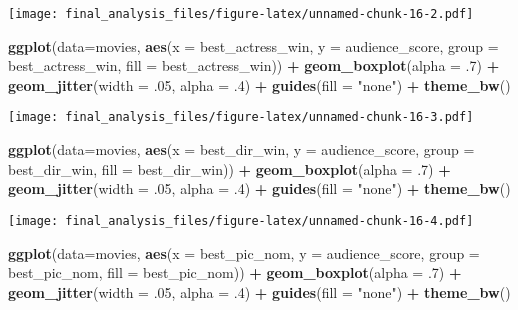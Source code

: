 \documentclass[]{article}
\newenvironment{Shaded}{\begin{snugshade}}{\end{snugshade}}
\newcommand{\DataTypeTok}[1]{\textcolor[rgb]{0.13,0.29,0.53}{#1}}
\newcommand{\FloatTok}[1]{\textcolor[rgb]{0.00,0.00,0.81}{#1}}
\newcommand{\KeywordTok}[1]{\textcolor[rgb]{0.13,0.29,0.53}{\textbf{#1}}}
\newcommand{\NormalTok}[1]{#1}
\newcommand{\OperatorTok}[1]{\textcolor[rgb]{0.81,0.36,0.00}{\textbf{#1}}}
\newcommand{\StringTok}[1]{\textcolor[rgb]{0.31,0.60,0.02}{#1}}
\begin{document}
\texttt{[image: final\_analysis\_files/figure-latex/unnamed-chunk-16-2.pdf]}

\begin{Shaded}
\begin{Highlighting}[]
\KeywordTok{ggplot}\NormalTok{(}\DataTypeTok{data=}\NormalTok{movies, }\KeywordTok{aes}\NormalTok{(}\DataTypeTok{x =}\NormalTok{ best_actress_win, }\DataTypeTok{y =}\NormalTok{ audience_score, }\DataTypeTok{group =}\NormalTok{ best_actress_win, }\DataTypeTok{fill =}\NormalTok{ best_actress_win)) }\OperatorTok{+}\StringTok{ }\KeywordTok{geom_boxplot}\NormalTok{(}\DataTypeTok{alpha =} \FloatTok{.7}\NormalTok{) }\OperatorTok{+}\StringTok{ }\KeywordTok{geom_jitter}\NormalTok{(}\DataTypeTok{width =} \FloatTok{.05}\NormalTok{, }\DataTypeTok{alpha =} \FloatTok{.4}\NormalTok{) }\OperatorTok{+}\StringTok{ }\KeywordTok{guides}\NormalTok{(}\DataTypeTok{fill =} \StringTok{"none"}\NormalTok{) }\OperatorTok{+}\StringTok{ }\KeywordTok{theme_bw}\NormalTok{()}
\end{Highlighting}
\end{Shaded}

\texttt{[image: final\_analysis\_files/figure-latex/unnamed-chunk-16-3.pdf]}

\begin{Shaded}
\begin{Highlighting}[]
\KeywordTok{ggplot}\NormalTok{(}\DataTypeTok{data=}\NormalTok{movies, }\KeywordTok{aes}\NormalTok{(}\DataTypeTok{x =}\NormalTok{ best_dir_win, }\DataTypeTok{y =}\NormalTok{ audience_score, }\DataTypeTok{group =}\NormalTok{ best_dir_win, }\DataTypeTok{fill =}\NormalTok{ best_dir_win)) }\OperatorTok{+}\StringTok{ }\KeywordTok{geom_boxplot}\NormalTok{(}\DataTypeTok{alpha =} \FloatTok{.7}\NormalTok{) }\OperatorTok{+}\StringTok{ }\KeywordTok{geom_jitter}\NormalTok{(}\DataTypeTok{width =} \FloatTok{.05}\NormalTok{, }\DataTypeTok{alpha =} \FloatTok{.4}\NormalTok{) }\OperatorTok{+}\StringTok{ }\KeywordTok{guides}\NormalTok{(}\DataTypeTok{fill =} \StringTok{"none"}\NormalTok{) }\OperatorTok{+}\StringTok{ }\KeywordTok{theme_bw}\NormalTok{()}
\end{Highlighting}
\end{Shaded}

\texttt{[image: final\_analysis\_files/figure-latex/unnamed-chunk-16-4.pdf]}

\begin{Shaded}
\begin{Highlighting}[]
\KeywordTok{ggplot}\NormalTok{(}\DataTypeTok{data=}\NormalTok{movies, }\KeywordTok{aes}\NormalTok{(}\DataTypeTok{x =}\NormalTok{ best_pic_nom, }\DataTypeTok{y =}\NormalTok{ audience_score, }\DataTypeTok{group =}\NormalTok{ best_pic_nom, }\DataTypeTok{fill =}\NormalTok{ best_pic_nom)) }\OperatorTok{+}\StringTok{ }\KeywordTok{geom_boxplot}\NormalTok{(}\DataTypeTok{alpha =} \FloatTok{.7}\NormalTok{) }\OperatorTok{+}\StringTok{ }\KeywordTok{geom_jitter}\NormalTok{(}\DataTypeTok{width =} \FloatTok{.05}\NormalTok{, }\DataTypeTok{alpha =} \FloatTok{.4}\NormalTok{) }\OperatorTok{+}\StringTok{ }\KeywordTok{guides}\NormalTok{(}\DataTypeTok{fill =} \StringTok{"none"}\NormalTok{) }\OperatorTok{+}\StringTok{ }\KeywordTok{theme_bw}\NormalTok{()}
\end{Highlighting}
\end{Shaded}
\end{document}
